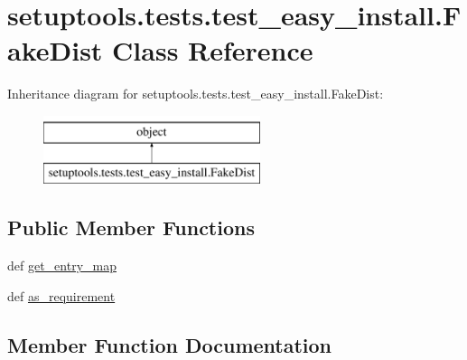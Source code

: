 \hypertarget{classsetuptools_1_1tests_1_1test__easy__install_1_1FakeDist}{}\section{setuptools.\+tests.\+test\+\_\+easy\+\_\+install.\+Fake\+Dist Class Reference}
\label{classsetuptools_1_1tests_1_1test__easy__install_1_1FakeDist}
Inheritance diagram for setuptools.\+tests.\+test\+\_\+easy\+\_\+install.\+Fake\+Dist\+:\begin{figure}[H]
\begin{center}
\leavevmode
\includegraphics[height=2.000000cm]{classsetuptools_1_1tests_1_1test__easy__install_1_1FakeDist}
\end{center}
\end{figure}
\subsection*{Public Member Functions}
\begin{DoxyCompactItemize}
\item 
def \hyperlink{classsetuptools_1_1tests_1_1test__easy__install_1_1FakeDist_a1b1574a1725a3338a3e520395f901c1d}{get\+\_\+entry\+\_\+map}
\item 
def \hyperlink{classsetuptools_1_1tests_1_1test__easy__install_1_1FakeDist_ab4a599e25ba4768b889df121d04625a1}{as\+\_\+requirement}
\end{DoxyCompactItemize}


\subsection{Member Function Documentation}
\hypertarget{classsetuptools_1_1tests_1_1test__easy__install_1_1FakeDist_ab4a599e25ba4768b889df121d04625a1}{}
